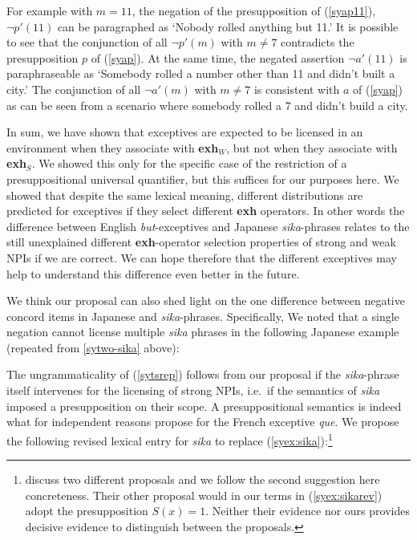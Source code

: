 \documentclass[output=paper]{langscibook}
\begin{document}
For example with $m = 11$, the negation of the presupposition of (\ref{syap11}), $\neg p'(11)$ can be paragraphed as `Nobody rolled anything but 11.'  It is possible to see that the conjunction of all $\neg p'(m)$ with $m \neq 7$ contradicts the presupposition $p$ of (\ref{syap}).   At the same time, the negated assertion $\neg a'(11)$ is paraphraseable as `Somebody rolled a number other than 11 and didn't built a city.' The conjunction of all $\neg a'(m)$ with $m \neq 7$ is consistent with $a$ of (\ref{syap}) as can be seen from a scenario where somebody rolled a 7 and didn't build a city.

In sum, we have shown that exceptives are expected to be licensed in an environment when they associate with \textbf{exh}$_W$, but not when they associate with \textbf{exh}$_S$.  We showed this only for the specific case of the restriction of a presuppositional universal quantifier, but this suffices for our purposes here.  We showed that despite the same lexical meaning, different distributions are predicted for exceptives if they select different \textbf{exh} operators. 
In other words the difference between English \emph{but}-exceptives and Japanese \emph{sika}-phrases relates to the still unexplained different \textbf{exh}-operator selection properties of strong and weak NPIs if we are correct.  We can hope therefore that the different exceptives may help to understand this difference even better in the future.

We think our proposal can also shed light on the one difference between negative concord items in Japanese and \emph{sika}-phrases.  Specifically, We noted that a single negation cannot license multiple \emph{sika} phrases in the following Japanese example (repeated from \ref{sytwo-sika} above): 

\z

The ungrammaticality of (\ref{sytsrep}) follows from our proposal if the \emph{sika}-phrase itself intervenes for the licensing of strong NPIs, i.e.\ if the semantics of \emph{sika} imposed a presupposition on their scope.  A presuppositional semantics is indeed what \citet[461--462]{fintel07a} for independent reasons propose for the French exceptive \emph{que}. We propose the following revised lexical entry for \emph{sika} to replace  (\ref{syex:sika}):\footnote{\citet{fintel07a} discuss two different proposals and we follow the second suggestion here concreteness. Their other proposal would in our terms in (\ref{syex:sikarev}) adopt the presupposition $S(x)=1$.  Neither their evidence nor ours provides decisive evidence to distinguish between the proposals.}
\end{document}
